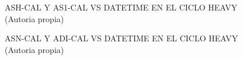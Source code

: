 \begin{figure}[H]
  \hfill
  \hfill
  \hfill
  \caption{ASH-CAL Y AS1-CAL VS DATETIME EN EL CICLO HEAVY (Autoria propia)}
  \end{figure}
\begin{figure}[H]
  \hfill
  \hfill
  \hfill
  \caption{ASN-CAL Y ADI-CAL VS DATETIME EN EL CICLO HEAVY (Autoria propia)}
  \end{figure}
